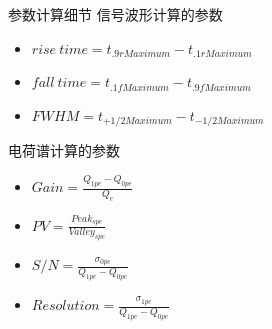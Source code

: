 \documentclass[11pt,compress,xcolor=x11names,UTF8]{beamer}
\begin{document}
%
%
%
\begin{frame}{参数计算细节}
信号波形计算的参数
\begin{itemize}
\item  $rise\ time=t_{.9rMaximum}-t_{.1rMaximum}$
\item $fall\ time=t_{.1fMaximum}-t_{.9fMaximum}$
\item $FWHM=t_{+1/2Maximum}-t_{-1/2Maximum}$
\end{itemize}

电荷谱计算的参数
\begin{itemize}
\item  $Gain=\frac{Q_{1pe}-Q_{0pe}}{Q_e}$
\item $PV=\frac{Peak_{spe}}{Valley_{spe}}$
\item $S/N=\frac{\sigma_{0pe}}{Q_{1pe}-Q_{0pe}}$
\item $Resolution=\frac{\sigma_{1pe}}{Q_{1pe}-Q_{0pe}}$
\end{itemize}


\end{frame}
\end{document}
